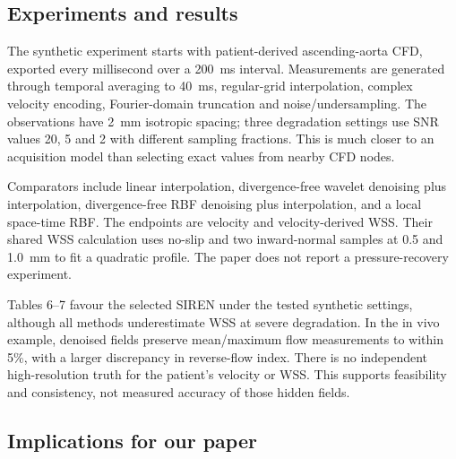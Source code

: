 \documentclass[11pt,a4paper]{article}
\begin{document}
\subsection{Experiments and results}

The synthetic experiment starts with patient-derived ascending-aorta CFD, exported every millisecond over a 200~ms interval. Measurements are generated through temporal averaging to 40~ms, regular-grid interpolation, complex velocity encoding, Fourier-domain truncation and noise/undersampling. The observations have 2~mm isotropic spacing; three degradation settings use SNR values 20, 5 and 2 with different sampling fractions. This is much closer to an acquisition model than selecting exact values from nearby CFD nodes.

Comparators include linear interpolation, divergence-free wavelet denoising plus interpolation, divergence-free RBF denoising plus interpolation, and a local space-time RBF. The endpoints are velocity and velocity-derived WSS. Their shared WSS calculation uses no-slip and two inward-normal samples at 0.5 and 1.0~mm to fit a quadratic profile. The paper does not report a pressure-recovery experiment.

Tables 6--7 favour the selected SIREN under the tested synthetic settings, although all methods underestimate WSS at severe degradation. In the in vivo example, denoised fields preserve mean/maximum flow measurements to within 5\%, with a larger discrepancy in reverse-flow index. There is no independent high-resolution truth for the patient's velocity or WSS. This supports feasibility and consistency, not measured accuracy of those hidden fields.

\subsection{Implications for our paper}
\end{document}
